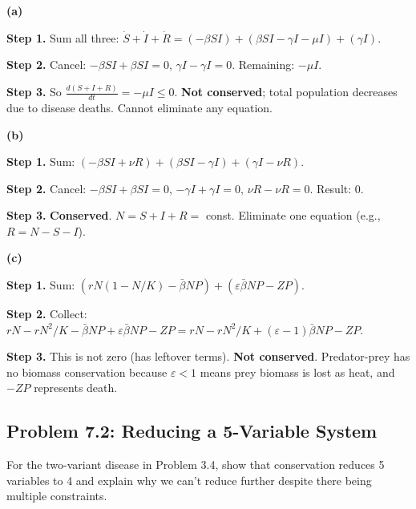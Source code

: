\documentclass[10pt]{article}
\begin{document}
\begin{solution}
\textbf{(a)} 

\textbf{Step 1.} Sum all three: $\dot S + \dot I + \dot R = (-\beta SI) + (\beta SI - \gamma I - \mu I) + (\gamma I)$.

\textbf{Step 2.} Cancel: $-\beta SI + \beta SI = 0$, $\gamma I - \gamma I = 0$. Remaining: $-\mu I$.

\textbf{Step 3.} So $\frac{d(S+I+R)}{dt} = -\mu I \leq 0$. \textbf{Not conserved}; total population decreases due to disease deaths. Cannot eliminate any equation.

\textbf{(b)}

\textbf{Step 1.} Sum: $(-\beta SI + \nu R) + (\beta SI - \gamma I) + (\gamma I - \nu R)$.

\textbf{Step 2.} Cancel: $-\beta SI + \beta SI = 0$, $-\gamma I + \gamma I = 0$, $\nu R - \nu R = 0$. Result: 0.

\textbf{Step 3.} \textbf{Conserved}. $N = S+I+R = $ const. Eliminate one equation (e.g., $R = N - S - I$).

\textbf{(c)}

\textbf{Step 1.} Sum: $(rN(1-N/K) - \bar\beta NP) + (\varepsilon\bar\beta NP - ZP)$.

\textbf{Step 2.} Collect: $rN - rN^2/K - \bar\beta NP + \varepsilon\bar\beta NP - ZP = rN - rN^2/K + (\varepsilon-1)\bar\beta NP - ZP$.

\textbf{Step 3.} This is not zero (has leftover terms). \textbf{Not conserved}. Predator-prey has no biomass conservation because $\varepsilon < 1$ means prey biomass is lost as heat, and $-ZP$ represents death.
\end{solution}

\subsection{Problem 7.2: Reducing a 5-Variable System}

\begin{problem}
For the two-variant disease in Problem 3.4, show that conservation reduces 5 variables to 4 and explain why we can't reduce further despite there being multiple constraints.
\end{problem}
\end{document}
